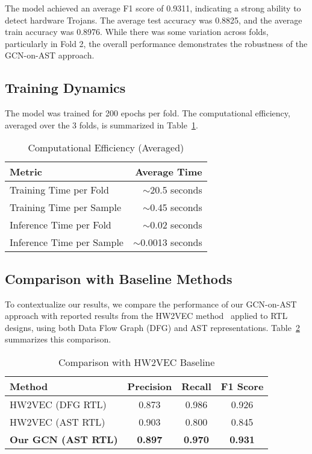 \documentclass[sigplan,screen]{acmart}
\begin{document}
The model achieved an average F1 score of 0.9311, indicating a strong ability to detect hardware Trojans. The average test accuracy was 0.8825, and the average train accuracy was 0.8976. While there was some variation across folds, particularly in Fold 2, the overall performance demonstrates the robustness of the GCN-on-AST approach. 

\subsection{Training Dynamics}
The model was trained for 200 epochs per fold. The computational efficiency, averaged over the 3 folds, is summarized in Table~\ref{tab:timing}. 

\begin{table}[htbp] %
  \caption{Computational Efficiency (Averaged)}
  \label{tab:timing}
  \centering
  \begin{tabular}{lr}
    \toprule
    Metric & Average Time \\
    \midrule
    Training Time per Fold & $\sim$20.5 seconds \\
    Training Time per Sample & $\sim$0.45 seconds \\
    Inference Time per Fold & $\sim$0.02 seconds \\
    Inference Time per Sample & $\sim$0.0013 seconds \\
  \bottomrule
\end{tabular}
\end{table}

\subsection{Comparison with Baseline Methods}
To contextualize our results, we compare the performance of our GCN-on-AST approach with reported results from the HW2VEC method~\cite{HW2VEC} applied to RTL designs, using both Data Flow Graph (DFG) and AST representations. Table~\ref{tab:baseline_comparison} summarizes this comparison.

\begin{table}[htbp]
  \caption{Comparison with HW2VEC Baseline}
  \label{tab:baseline_comparison}
  \centering
  \begin{tabular}{lccc}
    \toprule
    Method & Precision & Recall & F1 Score \\
    \midrule
    HW2VEC (DFG RTL) & 0.873 & 0.986 & 0.926 \\
    HW2VEC (AST RTL) & 0.903 & 0.800 & 0.845 \\
    \midrule
    \textbf{Our GCN (AST RTL)} & \textbf{0.897} & \textbf{0.970} & \textbf{0.931} \\
  \bottomrule
\end{tabular}
\end{table}
\end{document}
